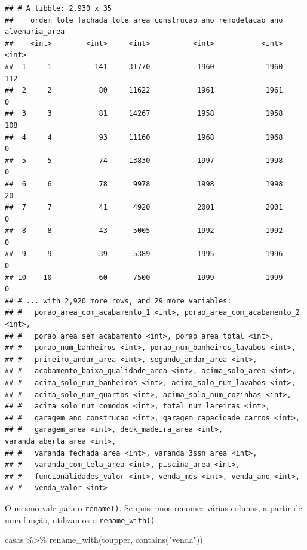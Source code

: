 \documentclass[
]{book}
\newenvironment{Shaded}{\begin{snugshade}}{\end{snugshade}}
\newcommand{\FunctionTok}[1]{\textcolor[rgb]{0.00,0.00,0.00}{#1}}
\newcommand{\NormalTok}[1]{#1}
\newcommand{\SpecialCharTok}[1]{\textcolor[rgb]{0.00,0.00,0.00}{#1}}
\newcommand{\StringTok}[1]{\textcolor[rgb]{0.31,0.60,0.02}{#1}}
\begin{document}
\begin{verbatim}
## # A tibble: 2,930 x 35
##    ordem lote_fachada lote_area construcao_ano remodelacao_ano alvenaria_area
##    <int>        <int>     <int>          <int>           <int>          <int>
##  1     1          141     31770           1960            1960            112
##  2     2           80     11622           1961            1961              0
##  3     3           81     14267           1958            1958            108
##  4     4           93     11160           1968            1968              0
##  5     5           74     13830           1997            1998              0
##  6     6           78      9978           1998            1998             20
##  7     7           41      4920           2001            2001              0
##  8     8           43      5005           1992            1992              0
##  9     9           39      5389           1995            1996              0
## 10    10           60      7500           1999            1999              0
## # ... with 2,920 more rows, and 29 more variables:
## #   porao_area_com_acabamento_1 <int>, porao_area_com_acabamento_2 <int>,
## #   porao_area_sem_acabamento <int>, porao_area_total <int>,
## #   porao_num_banheiros <int>, porao_num_banheiros_lavabos <int>,
## #   primeiro_andar_area <int>, segundo_andar_area <int>,
## #   acabamento_baixa_qualidade_area <int>, acima_solo_area <int>,
## #   acima_solo_num_banheiros <int>, acima_solo_num_lavabos <int>,
## #   acima_solo_num_quartos <int>, acima_solo_num_cozinhas <int>,
## #   acima_solo_num_comodos <int>, total_num_lareiras <int>,
## #   garagem_ano_construcao <int>, garagem_capacidade_carros <int>,
## #   garagem_area <int>, deck_madeira_area <int>, varanda_aberta_area <int>,
## #   varanda_fechada_area <int>, varanda_3ssn_area <int>,
## #   varanda_com_tela_area <int>, piscina_area <int>,
## #   funcionalidades_valor <int>, venda_mes <int>, venda_ano <int>,
## #   venda_valor <int>
\end{verbatim}

O mesmo vale para o \texttt{rename()}. Se quisermos renomer várias colunas, a partir de uma função, utilizamos o \texttt{rename\_with()}.

\begin{Shaded}
\begin{Highlighting}[]
\NormalTok{casas }\SpecialCharTok{\%\textgreater{}\%}
  \FunctionTok{rename\_with}\NormalTok{(toupper, }\FunctionTok{contains}\NormalTok{(}\StringTok{"venda"}\NormalTok{))}
\end{Highlighting}
\end{Shaded}
\end{document}
